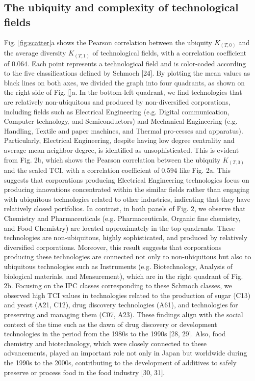 \documentclass[fleqn,10pt]{wlscirep}
\begin{document}
\subsection*{The ubiquity and complexity of technological fields}
Fig. \ref{fig:scatter}a shows the Pearson correlation between the ubiquity \(K_(T,0)\) and the average diversity \(K_(T,1)\) of technological fields, with a correlation coefficient of 0.064. Each point represents a technological field and is color-coded according to the five classifications defined by Schmoch [24]. By plotting the mean values as black lines on both axes, we divided the graph into four quadrants, as shown on the right side of Fig. \ref{}a. In the bottom-left quadrant, we find technologies that are relatively non-ubiquitous and produced by non-diversified corporations, including fields such as Electrical Engineering (e.g. Digital communication, Computer technology, and Semiconductors) and Mechanical Engineering (e.g. Handling, Textile and paper machines, and Thermal pro-cesses and apparatus). Particularly, Electrical Engineering, despite having low degree centrality and average mean neighbor degree, is identified as unsophisticated. This is evident from Fig. 2b, which shows the Pearson correlation between the ubiquity \(K_(T,0)\) and the scaled TCI, with a correlation coefficient of 0.594 like Fig. 2a. This suggests that corporations producing Electrical Engineering technologies focus on producing innovations concentrated within the similar fields rather than engaging with ubiquitous technologies related to other industries, indicating that they have relatively closed portfolios. In contrast, in both panels of Fig. 2, we observe that Chemistry and Pharmaceuticals (e.g. Pharmaceuticals, Organic fine chemistry, and Food Chemistry) are located approximately in the top quadrants. These technologies are non-ubiquitous, highly sophisticated, and produced by relatively diversified corporations. Moreover, this result suggests that corporations producing these technologies are connected not only to non-ubiquitous but also to ubiquitous technologies such as Instruments (e.g. Biotechnology, Analysis of biological materials, and Measurement), which are in the right quadrant of Fig. 2b. Focusing on the IPC classes corresponding to these Schmoch classes, we observed high TCI values in technologies related to the production of sugar (C13) and yeast (A21, C12), drug discovery technologies (A61), and technologies for preserving and managing them (C07, A23). These findings align with the social context of the time such as the dawn of drug discovery or development technologies in the period from the 1980s to the 1990s [28, 29]. Also, food chemistry and biotechnology, which were closely connected to these advancements, played an important role not only in Japan but worldwide during the 1990s to the 2000s, contributing to the development of additives to safely preserve or process food in the food industry [30, 31].
\end{document}
